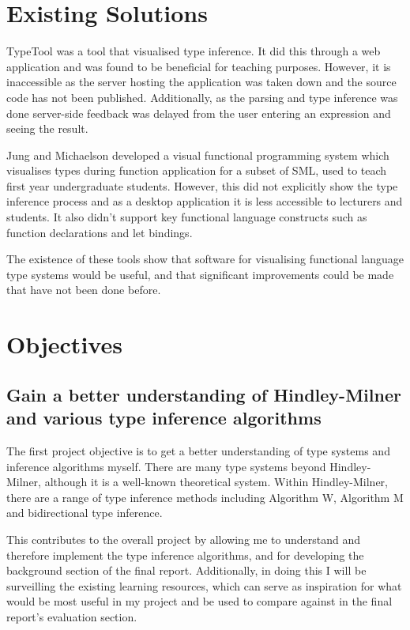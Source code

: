 \documentclass[12pt]{article}
\begin{document}
\section{Existing Solutions}

TypeTool\cite{ref6} was a tool that visualised type inference. It did this through a web application and was found to be beneficial for teaching purposes. However, it is inaccessible as the server hosting the application was taken down and the source code has not been published. Additionally, as the parsing and type inference was done server-side feedback was delayed from the user entering an expression and seeing the result.

Jung and Michaelson developed a visual functional programming system which visualises types during function application for a subset of SML, used to teach first year undergraduate students.\cite{ref7} However, this did not explicitly show the type inference process and as a desktop application it is less accessible to lecturers and students. It also didn’t support key functional language constructs such as function declarations and let bindings.

The existence of these tools show that software for visualising functional language type systems would be useful, and that significant improvements could be made that have not been done before.

\section{Objectives}

\subsection{Gain a better understanding of Hindley-Milner and various type inference algorithms}

The first project objective is to get a better understanding of type systems and inference algorithms myself. There are many type systems beyond Hindley-Milner, although it is a well-known theoretical system. Within Hindley-Milner, there are a range of type inference methods including Algorithm W\cite{ref8}, Algorithm M\cite{ref9} and bidirectional\cite{ref10} type inference.

This contributes to the overall project by allowing me to understand and therefore implement the type inference algorithms, and for developing the background section of the final report. Additionally, in doing this I will be surveilling the existing learning resources, which can serve as inspiration for what would be most useful in my project and be used to compare against in the final report’s evaluation section.
\end{document}
